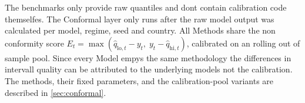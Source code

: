 The benchmarks only provide raw quantiles and dont contain calibration code themselfes. The Conformal layer only runs after the raw model output was calculated per model, regime, seed and country. All Methods share the non conformity score $E_t = \max(\hat{q}_{\mathrm{lo},t} - y_t,\; y_t - \hat{q}_{\mathrm{hi},t})$, calibrated on an rolling out of sample pool. Since every Model empys the same methodology the differences in intervall quality can be attributed to the underlying models not the calibration. The methods, their fixed parameters, and
the calibration-pool variants are described in \cref{sec:conformal}.

